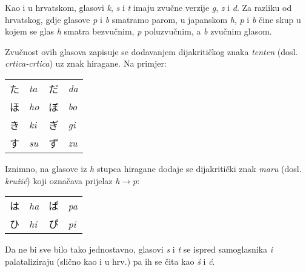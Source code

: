 
	Kao i u hrvatskom, glasovi \textit{k}, \textit{s} i \textit{t} imaju zvučne verzije \textit{g}, \textit{z} i \textit{d}. Za razliku od hrvatskog, gdje glasove \textit{p} i \textit{b} smatramo parom, u japanskom \textit{h}, \textit{p} i \textit{b} čine skup u kojem se glas \textit{h} smatra bezvučnim, \textit{p} poluzvučnim\footnotemark[1], a \textit{b} zvučnim glasom.
	
	Zvučnost ovih glasova zapisuje se dodavanjem dijakritičkog znaka \textit{tenten} (dosl. \textit{crtica-crtica}) uz znak hiragane. Na primjer:
	
	\vspace{5pt}
	\begin{tabular}{l l l l}
		た&\textit{ta}&だ&\textit{da}\\
		ほ&\textit{ho}&ぼ&\textit{bo}\\
		き&\textit{ki}&ぎ&\textit{gi}\\
		す&\textit{su}&ず&\textit{zu}\\
	\end{tabular}
	
	
	Iznimno, na glasove iz \textit{h} stupca hiragane dodaje se dijakritički znak \textit{maru} (dosl. \textit{kružić}) koji označava prijelaz \textit{h}$\rightarrow$\textit{p}:
	
	\vspace{5pt}
	\begin{tabular}{l l l l}
		は&\textit{ha}&ぱ&\textit{pa}\\
		ひ&\textit{hi}&ぴ&\textit{pi}\\
	\end{tabular}

	\vspace{5pt}
	Da ne bi sve bilo tako jednostavno, glasovi \textit{s} i \textit{t} se ispred samoglasnika \textit{i} palataliziraju (slično kao i u hrv.) pa ih se čita kao \textit{\'{s}} i \textit{ć}.
	
